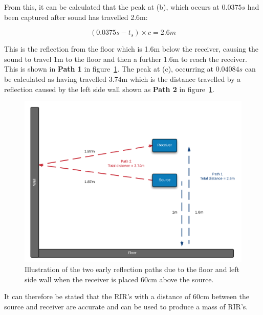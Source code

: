 \documentclass[../../main.tex]{subfiles}
\begin{document}
			From this, it can be calculated that the peak at (b), which occurs at $0.0375s$ had been captured after sound has travelled 2.6m:

			\begin{equation}
			(0.0375s - t_s)\times{c} = 2.6m
			\end{equation}

			This is the reflection from the floor which is 1.6m below the receiver, causing the sound to travel 1m to the floor and then a further 1.6m to reach the receiver. This is shown in \textbf{Path 1} in figure~\ref{reflectionPaths}. The peak at (c), occurring at $0.04084s$ can be calculated as having travelled 3.74m which is the distance travelled by a reflection caused by the left side wall shown as \textbf{Path 2} in figure~\ref{reflectionPaths}.

			\begin{figure}[H]
			\centerline{\includegraphics[scale = 0.25]{Sections/Implementation/Odeon/images/incorrectRIR/reflectionPaths_colourV2.png}}
				\caption{Illustration of the two early reflection paths due to the floor and left side wall when the receiver is placed 60cm above the source.}
				\label{reflectionPaths}
			\end{figure}

			It can therefore be stated that the \ac{RIR}'s with a distance of 60cm between the source and receiver are accurate and can be used to produce a mass of \ac{RIR}'s.
\end{document}
